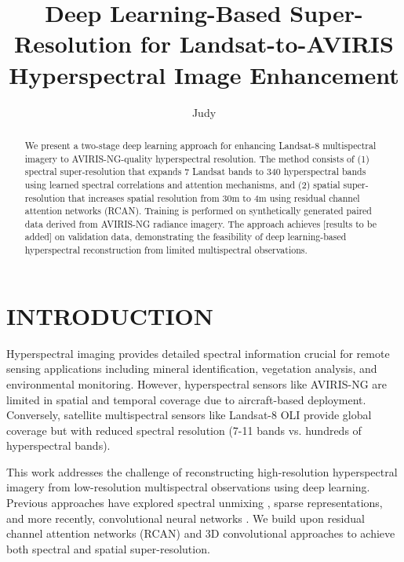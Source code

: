 \documentclass[]{spieman}
\title{Deep Learning-Based Super-Resolution for Landsat-to-AVIRIS Hyperspectral Image Enhancement}
\author[a]{Judy}
\affil[a]{Department, Institution, Address}
\begin{document}
\maketitle

\begin{abstract}
We present a two-stage deep learning approach for enhancing Landsat-8 multispectral imagery to AVIRIS-NG-quality hyperspectral resolution. The method consists of (1) spectral super-resolution that expands 7 Landsat bands to 340 hyperspectral bands using learned spectral correlations and attention mechanisms, and (2) spatial super-resolution that increases spatial resolution from 30m to 4m using residual channel attention networks (RCAN). Training is performed on synthetically generated paired data derived from AVIRIS-NG radiance imagery. The approach achieves [results to be added] on validation data, demonstrating the feasibility of deep learning-based hyperspectral reconstruction from limited multispectral observations.
\end{abstract}



\section{INTRODUCTION}
\label{sec:intro}

Hyperspectral imaging provides detailed spectral information crucial for remote sensing applications including mineral identification, vegetation analysis, and environmental monitoring. However, hyperspectral sensors like AVIRIS-NG \cite{green2015aviris} are limited in spatial and temporal coverage due to aircraft-based deployment. Conversely, satellite multispectral sensors like Landsat-8 OLI \cite{roy2014landsat} provide global coverage but with reduced spectral resolution (7-11 bands vs. hundreds of hyperspectral bands).

This work addresses the challenge of reconstructing high-resolution hyperspectral imagery from low-resolution multispectral observations using deep learning. Previous approaches have explored spectral unmixing \cite{dong2016hyperspectral}, sparse representations, and more recently, convolutional neural networks \cite{sidorov2019deep, xie2018multispectral}. We build upon residual channel attention networks (RCAN) \cite{zhang2018rcan} and 3D convolutional approaches \cite{mei2019hyperspectral, mei2020spatial} to achieve both spectral and spatial super-resolution.
\end{document}
